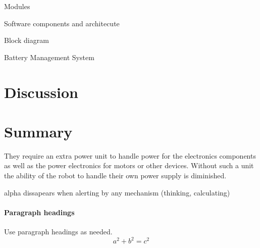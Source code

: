 Modules

Software components and architecute

Block diagram

Battery Management System 
\section{Discussion}

\section{Summary}

They require an extra power unit to handle power for the electronics components as well as the power electronics for motors or other devices.  Without such a unit the ability of the robot to handle their own power supply is diminished.


alpha dissapears when alerting by any mechanism (thinking, calculating)

\paragraph{Paragraph headings} Use paragraph headings as needed.
\begin{equation}
a^2+b^2=c^2
\end{equation}

